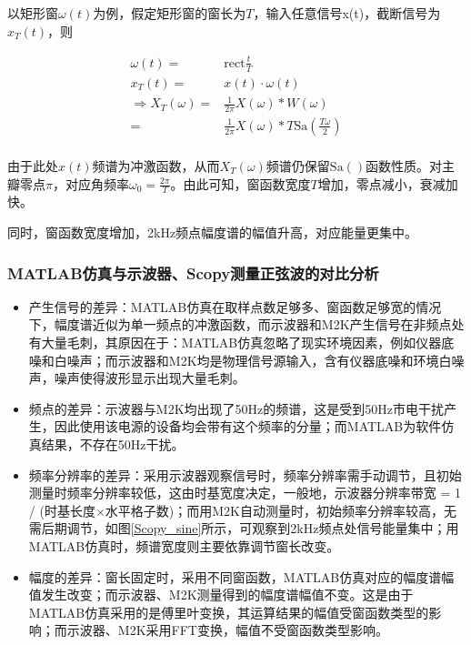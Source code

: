 \documentclass[12pt]{article}
\begin{document}
以矩形窗$\omega(t)$为例，假定矩形窗的窗长为$T$，输入任意信号x(t)，截断信号为$x_{T}(t)$，则
\begin{center}
{\setlength\abovedisplayskip{-0.3cm}
    \begin{equation}
        \begin{aligned}
        \omega(t)=&\mathrm{rect}\frac{t}{T}\\
        x_{T}(t)=&x(t)\cdot \omega(t)\\
        \Rightarrow X_{T}(\omega)=&\frac{1}{2\pi}X(\omega)*W(\omega)\\
        =& \frac{1}{2\pi}X(\omega)* T\mathrm{Sa}(\frac{T\omega}{2})\\
        \end{aligned}
    \end{equation}
    }
    \label{omega}
\end{center}
由于此处$x(t)$频谱为冲激函数，从而$X_{T}(\omega)$频谱仍保留$\mathrm{Sa}()$函数性质。对主瓣零点$\pi$，对应角频率$\omega_{0}=\frac{2\pi}{T}$。由此可知，窗函数宽度$T$增加，零点减小，衰减加快。

同时，窗函数宽度增加，2kHz频点幅度谱的幅值升高，对应能量更集中。

\subsubsection{MATLAB仿真与示波器、Scopy测量正弦波的对比分析}
\begin{itemize}
    \item 产生信号的差异：MATLAB仿真在取样点数足够多、窗函数足够宽的情况下，幅度谱近似为单一频点的冲激函数，而示波器和M2K产生信号在非频点处有大量毛刺，其原因在于：MATLAB仿真忽略了现实环境因素，例如仪器底噪和白噪声；而示波器和M2K均是物理信号源输入，含有仪器底噪和环境白噪声，噪声使得波形显示出现大量毛刺。
    \item 频点的差异：示波器与M2K均出现了50Hz的频谱，这是受到50Hz市电干扰产生，因此使用该电源的设备均会带有这个频率的分量；而MATLAB为软件仿真结果，不存在50Hz干扰。
    \item 频率分辨率的差异：采用示波器观察信号时，频率分辨率需手动调节，且初始测量时频率分辨率较低，这由时基宽度决定，一般地，示波器分辨率带宽 = 1 / (时基长度$\times$水平格子数)；而用M2K自动测量时，初始频率分辨率较高，无需后期调节，如图\ref{Scopy_sine}所示，可观察到2kHz频点处信号能量集中；用MATLAB仿真时，频谱宽度则主要依靠调节窗长改变。
    \item 幅度的差异：窗长固定时，采用不同窗函数，MATLAB仿真对应的幅度谱幅值发生改变；而示波器、M2K测量得到的幅度谱幅值不变。这是由于MATLAB仿真采用的是傅里叶变换，其运算结果的幅值受窗函数类型的影响；而示波器、M2K采用FFT变换，幅值不受窗函数类型影响。
\end{itemize}
\end{document}
